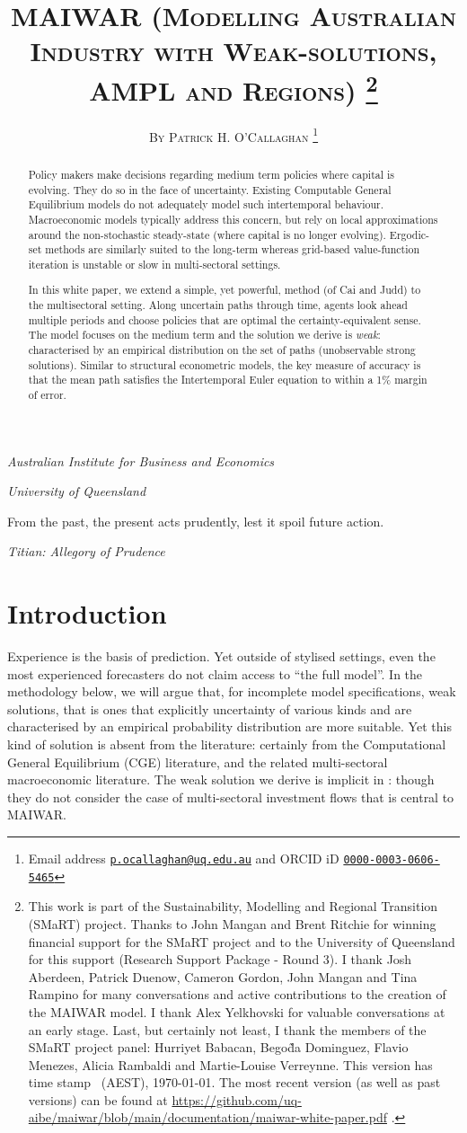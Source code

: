 \documentclass[12pt,a4paper,twoside, draft]{article}
\title{
   \textsc{
MAIWAR (Modelling Australian Industry with Weak-solutions, AMPL and Regions)
}
\footnote{
      This work is part of the Sustainability, Modelling and Regional
      Transition (SMaRT) project.
      Thanks to John Mangan and Brent Ritchie for winning financial support for
      the SMaRT project and to the University of Queensland for this support
      (Research Support Package - Round 3).
      I thank Josh Aberdeen, Patrick Duenow, Cameron Gordon, John Mangan and
      Tina Rampino for many conversations and active contributions to the
      creation of the MAIWAR model.
      I thank Alex Yelkhovski for valuable conversations at an early stage. 
      Last, but certainly not least, I thank the members of the SMaRT project
      panel: Hurriyet Babacan, Bego\~{d}a Dominguez, Flavio Menezes, Alicia
      Rambaldi and Martie-Louise Verreynne.
      This version has time stamp \currenttime~(AEST), \today. The most recent
      version (as well as past versions) can be found at
      \url{https://github.com/uq-aibe/maiwar/blob/main/documentation/maiwar-white-paper.pdf} .}}
\author{\large\textsc{By Patrick H. O'Callaghan}
   \footnote{Email address
    \href{mailto:p.ocallaghan@uq.edu.au}{\texttt{p.ocallaghan@uq.edu.au}} and
    ORCID iD \href{http://orcid.org/0000-0003-0606-5465}{
      \texttt{0000-0003-0606-5465}} }}
\date{}
\makeatletter
\renewcommand\maketitle
  {\begin{center}\mdseries\large
    {\@title}%
    \par\medskip\medskip
    {\normalsize\@author}%
    \par\medskip\medskip\normalfont
    \begin{small}
\emph{Australian Institute for Business and Economics}
\end{small}
\par
\begin{small}
\emph{University of Queensland}
\end{small}
   \end{center}
  }
\makeatother
\begin{document}
  \maketitle

  \pagestyle{fancy}
\renewcommand{\abstractname}{\vspace{-\baselineskip}} \thispagestyle{plain}
%

\begin{abstract}%
  
  Policy makers make decisions regarding medium term policies where capital is
  evolving.
  They do so in the face of uncertainty.
  Existing Computable General Equilibrium models do not adequately model
  such intertemporal behaviour.
  Macroeconomic models typically address this concern, but
  rely on local approximations around the non-stochastic steady-state
  (where capital is no longer evolving). Ergodic-set methods are similarly
  suited to the long-term whereas grid-based value-function iteration is
  unstable or slow in multi-sectoral settings.
  
  In this white paper, we extend a simple, yet powerful, method (of Cai and
  Judd) to the multisectoral setting. Along uncertain paths through time,
  agents look ahead multiple periods and choose policies that are optimal the
  certainty-equivalent sense. 
  The model focuses on the medium term and the solution we derive is
  \emph{weak}: characterised by an empirical distribution on the set of
  paths (unobservable strong solutions).
  Similar to structural econometric models, the key measure of accuracy is that
  the mean path satisfies the Intertemporal Euler equation to within a 1\%
  margin of error.
\end{abstract}
\setlength{\epigraphwidth}{11.5cm}
\epigraph{
   From the past, the present acts prudently, lest it spoil future action.
  }{\emph{Titian:  Allegory of Prudence}
}

\section{Introduction}\label{sec-introduction}
Experience is the basis of prediction.  Yet outside of stylised settings, even
the most experienced forecasters do not claim  access to ``the full
model''.
In the methodology below, we will argue that, for incomplete model
specifications, weak solutions, that is ones that explicitly uncertainty of
various kinds and are characterised by an empirical probability distribution
are more suitable.
Yet this kind of solution is absent from the literature: certainly from
the Computational General Equilibrium (CGE) literature, and the related
multi-sectoral macroeconomic literature.
The weak solution we derive is implicit in \citet{CJ}: though they do not
consider the case of multi-sectoral investment flows that is central to MAIWAR.
\end{document}
